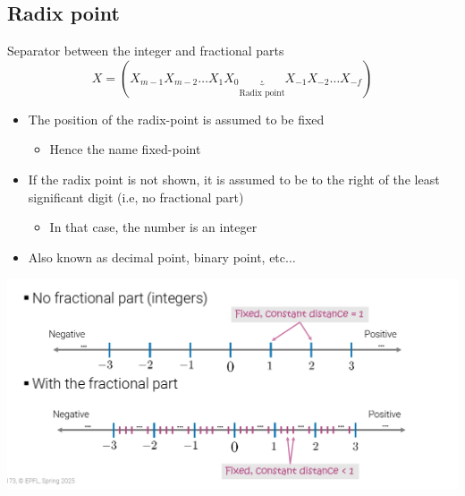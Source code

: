 \subsection{Radix point}
\begin{parag}{Separator between the integer and fractional parts}
    \[X = (X_{m-1}X_{m-2}\dots X_1X_0\underbrace{.}_{\text{Radix point}}X_{-1}X_{-2}\dots X_{-f})\]
    \begin{itemize}
        \item The position of the radix-point is assumed to be fixed
        \begin{itemize}
            \item Hence the name fixed-point
        \end{itemize}
        \item If the radix point is not shown, it is assumed to be to the right of the least significant digit (i.e, no fractional part)
        \begin{itemize}
            \item In that case, the number is an integer
        \end{itemize}
        \item Also known as decimal point, binary point, etc$\dots$
    \end{itemize}
\end{parag}
\begin{center}
\includegraphics[scale=0.5]{Screenshot 2025-02-24 131346.png}
\end{center}
